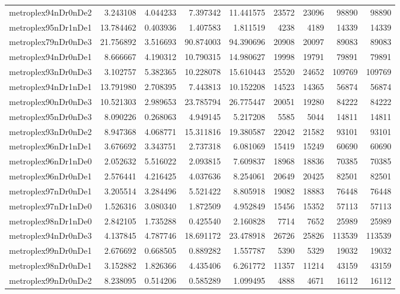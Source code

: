 \begin{longtable}{|l|r|r|r|r|r|r|r|r|}
metroplex94nDr0nDe2 & 3.243108 & 4.044233 & 7.397342 & 11.441575 & 23572 & 23096 & 98890 & 98890 \\
metroplex95nDr1nDe1 & 13.784462 & 0.403936 & 1.407583 & 1.811519 & 4238 & 4189 & 14339 & 14339 \\
metroplex79nDr0nDe3 & 21.756892 & 3.516693 & 90.874003 & 94.390696 & 20908 & 20097 & 89083 & 89083 \\
metroplex94nDr0nDe1 & 8.666667 & 4.190312 & 10.790315 & 14.980627 & 19998 & 19791 & 79891 & 79891 \\
metroplex93nDr0nDe3 & 3.102757 & 5.382365 & 10.228078 & 15.610443 & 25520 & 24652 & 109769 & 109769 \\
metroplex94nDr1nDe1 & 13.791980 & 2.708395 & 7.443813 & 10.152208 & 14523 & 14365 & 56874 & 56874 \\
metroplex90nDr0nDe3 & 10.521303 & 2.989653 & 23.785794 & 26.775447 & 20051 & 19280 & 84222 & 84222 \\
metroplex95nDr0nDe3 & 8.090226 & 0.268063 & 4.949145 & 5.217208 & 5585 & 5044 & 14811 & 14811 \\
metroplex93nDr0nDe2 & 8.947368 & 4.068771 & 15.311816 & 19.380587 & 22042 & 21582 & 93101 & 93101 \\
metroplex96nDr1nDe1 & 3.676692 & 3.343751 & 2.737318 & 6.081069 & 15419 & 15249 & 60690 & 60690 \\
metroplex96nDr1nDe0 & 2.052632 & 5.516022 & 2.093815 & 7.609837 & 18968 & 18836 & 70385 & 70385 \\
metroplex96nDr0nDe1 & 2.576441 & 4.216425 & 4.037636 & 8.254061 & 20649 & 20425 & 82501 & 82501 \\
metroplex97nDr0nDe1 & 3.205514 & 3.284496 & 5.521422 & 8.805918 & 19082 & 18883 & 76448 & 76448 \\
metroplex97nDr1nDe0 & 1.526316 & 3.080340 & 1.872509 & 4.952849 & 15456 & 15352 & 57113 & 57113 \\
metroplex98nDr1nDe0 & 2.842105 & 1.735288 & 0.425540 & 2.160828 & 7714 & 7652 & 25989 & 25989 \\
metroplex94nDr0nDe3 & 4.137845 & 4.787746 & 18.691172 & 23.478918 & 26726 & 25826 & 113539 & 113539 \\
metroplex99nDr0nDe1 & 2.676692 & 0.668505 & 0.889282 & 1.557787 & 5390 & 5329 & 19032 & 19032 \\
metroplex98nDr0nDe1 & 3.152882 & 1.826366 & 4.435406 & 6.261772 & 11357 & 11214 & 43159 & 43159 \\
metroplex99nDr0nDe2 & 8.238095 & 0.514206 & 0.585289 & 1.099495 & 4888 & 4671 & 16112 & 16112 \\

\end{longtable}
